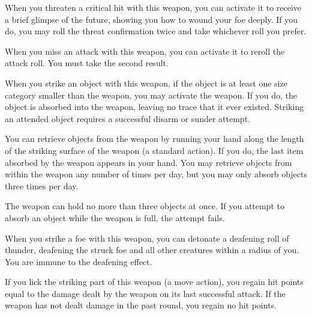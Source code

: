 
 When you threaten a critical hit with this weapon, you can activate it to receive a brief glimpse of the future, showing you how to wound your foe deeply. If you do, you may roll the threat confirmation twice and take whichever roll you prefer.


 When you miss an attack with this weapon, you can activate it to reroll the attack roll. You must take the second result.


 When you strike an object with this weapon, if the object is at least one size category smaller than the weapon, you may activate the weapon. If you do, the object is absorbed into the weapon, leaving no trace that it ever existed. Striking an attended object requires a successful disarm or sunder attempt.

You can retrieve objects from the weapon by running your hand along the length of the striking surface of the weapon (a standard action). If you do, the last item absorbed by the weapon appears in your hand. You may retrieve objects from within the weapon any number of times per day, but you may only absorb objects three times per day.

The weapon can hold no more than three objects at once. If you attempt to absorb an object while the weapon is full, the attempt fails. 


 When you strike a foe with this weapon, you can detonate a deafening roll of thunder, deafening the struck foe and all other creatures within a \areasmall radius of you. You are immune to the deafening effect.


 If you lick the striking part of this weapon (a move action), you regain hit points equal to the damage dealt by the weapon on its last successful attack. If the weapon has not dealt damage in the past round, you regain no hit points.

